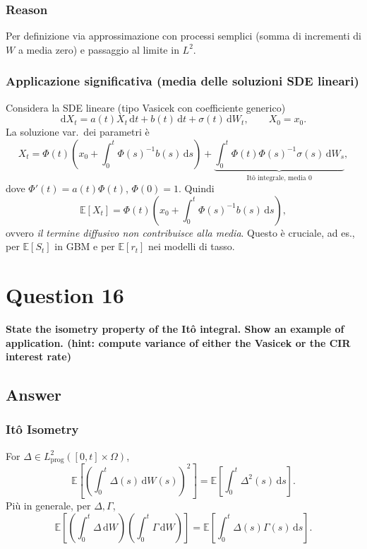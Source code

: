 \documentclass[12pt,a4paper]{book}
\theoremstyle{remark}
\newcommand{\EE}{\mathbb{E}}          %
\newcommand{\dd}{\mathrm{d}}
\begin{document}
\subsubsection*{Reason}
Per definizione via approssimazione con processi semplici (somma di incrementi di $W$ a media zero) e passaggio al limite in $L^2$.

\subsubsection*{Applicazione significativa (media delle soluzioni SDE lineari)}
Considera la SDE lineare (tipo Vasicek con coefficiente generico)
\[
\dd X_t = a(t)X_t\,\dd t + b(t)\,\dd t + \sigma(t)\,\dd W_t,\qquad X_0=x_0.
\]
La soluzione var.\ dei parametri \`e
\[
X_t = \Phi(t)\!\left(x_0 + \int_0^t \Phi(s)^{-1} b(s)\,\dd s\right)
+ \underbrace{\int_0^t \Phi(t)\Phi(s)^{-1}\sigma(s)\,\dd W_s}_{\text{It\^o integrale, media 0}},
\]
dove $\Phi'(t)=a(t)\Phi(t)$, $\Phi(0)=1$. Quindi
\[
\EE[X_t]= \Phi(t)\!\left(x_0 + \int_0^t \Phi(s)^{-1} b(s)\,\dd s\right),
\]
ovvero \emph{il termine diffusivo non contribuisce alla media}. Questo \`e cruciale, ad es., per $\EE[S_t]$ in GBM e per $\EE[r_t]$ nei modelli di tasso.




\newpage
\section{Question 16}
\textbf{State the isometry property of the It\^o integral. Show an example of application. (hint: compute variance of either the Vasicek or the CIR interest rate)}

\subsection*{Answer}

\subsubsection*{It\^o Isometry}
For $\Delta \in L^2_{\text{prog}}([0,t]\times\Omega)$,
\[
\boxed{\;\EE\!\left[\left(\int_0^t \Delta(s)\,\dd W(s)\right)^{\!2}\right]
= \EE\!\left[\int_0^t \Delta^2(s)\,\dd s\right].\;}
\]
Pi\`u in generale, per $\Delta,\Gamma$,
\[
\EE\!\left[\!\left(\int_0^t \Delta\,\dd W\right)\!\!\left(\int_0^t \Gamma\,\dd W\right)\!\right]
= \EE\!\left[\int_0^t \Delta(s)\Gamma(s)\,\dd s\right].
\]
\end{document}
